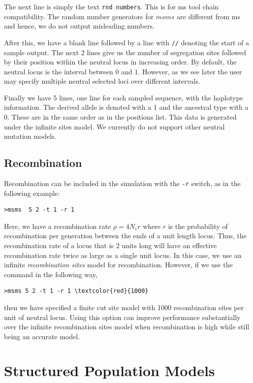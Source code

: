 \documentclass{article}
\begin{document}
The next line is simply the text {\tt rnd numbers}. This is for ms tool chain
compatibility. The random number generators for $msms$ are different from ms and
hence, we do not output misleading numbers.

After this, we have a blank line followed by a line with {\tt //} denoting the
start of a sample output. The next 2 lines give us the number of segregation
sites followed by their position within the neutral locus in increasing order.
By default, the neutral locus is the interval between $0$ and $1$. However, as we
see later the user may specify multiple neutral selected loci over different
intervals. 

Finally we have 5 lines, one line for each sampled sequence, with the haplotype
information. The derived allele is denoted with a 1 and the ancestral type with a 0. These are
in the same order as in the positions list. This data is generated under the
infinite sites model. We currently do not support other neutral mutation models. 


\subsection{Recombination}

Recombination can be included in the simulation with the {\tt -r} switch, as
in the following example:
\begin{verbatim}
>msms  5 2 -t 1 -r 1 
\end{verbatim}
Here, we have a recombination rate $\rho=4N_er$ where $r$ is the probability of
recombination per generation between the ends of a unit length locus. Thus, the
recombination rate of a locus that is 2 units long will have an effective
recombination rate twice as large as a single unit locus. In this case, we 
use an infinite {\it recombination sites} model for recombination. However, if
we use the command in the following way, 
\begin{Verbatim}[commandchars=\\\{\}]
>msms 5 2 -t 1 -r 1 \textcolor{red}{1000} 
\end{Verbatim}
then we have specified a finite cut site model with 1000 recombination sites per unit
of neutral locus. Using this option can improve performance substantially over
the infinite recombination sites model when recombination is high while still
being an accurate model. 

\section{Structured Population Models}
\end{document}
